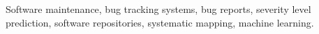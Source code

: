 Software maintenance, bug tracking systems, bug reports, severity level prediction, software repositories, systematic mapping, machine learning.
